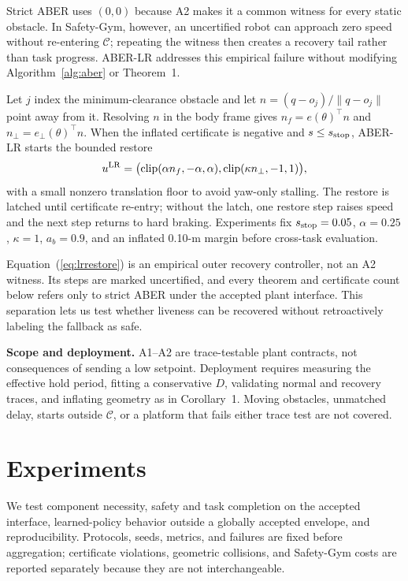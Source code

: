 \documentclass[letterpaper]{article}
\begin{document}
Strict ABER uses $(0,0)$ because A2 makes it a common witness for every
static obstacle.  In Safety-Gym, however, an uncertified robot can approach
zero speed without re-entering $\mathcal C$; repeating the witness then
creates a recovery tail rather than task progress.  ABER-LR addresses this
empirical failure without modifying Algorithm~\ref{alg:aber} or Theorem~1.

Let $j$ index the minimum-clearance obstacle and let
$n=(q-o_j)/\|q-o_j\|$ point away from it.  Resolving $n$ in the body frame
gives $n_f=e(\theta)^\top n$ and
$n_\perp=e_\perp(\theta)^\top n$.  When the inflated certificate is negative
and $s\le s_{\rm stop}$, ABER-LR starts the bounded restore
\begin{equation}
 u^{\rm LR}=\bigl(\operatorname{clip}(\alpha n_f,-\alpha,\alpha),
 \operatorname{clip}(\kappa n_\perp,-1,1)\bigr),       \label{eq:lrrestore}
\end{equation}
with a small nonzero translation floor to avoid yaw-only stalling.  The
restore is latched until certificate re-entry; without the latch, one restore
step raises speed and the next step returns to hard braking.  Experiments fix
$s_{\rm stop}=0.05$, $\alpha=0.25$, $\kappa=1$, $a_b=0.9$, and an inflated
0.10-m margin before cross-task evaluation.

Equation~(\ref{eq:lrrestore}) is an empirical outer recovery controller, not
an A2 witness.  Its steps are marked uncertified, and every theorem and
certificate count below refers only to strict ABER under the accepted plant
interface.  This separation lets us test whether liveness can be recovered
without retroactively labeling the fallback as safe.

\textbf{Scope and deployment.}
A1--A2 are trace-testable plant contracts, not consequences of sending a low
setpoint.  Deployment requires measuring the effective hold period, fitting a
conservative $D$, validating normal and recovery traces, and inflating geometry
as in Corollary~1.  Moving obstacles, unmatched delay, starts outside
$\mathcal C$, or a platform that fails either trace test are not covered.

\section{Experiments}

We test component necessity, safety and task completion on the accepted
interface, learned-policy behavior outside a globally accepted envelope, and
reproducibility.  Protocols, seeds, metrics, and failures are fixed before
aggregation; certificate violations, geometric collisions, and Safety-Gym
costs are reported separately because they are not interchangeable.
\end{document}
